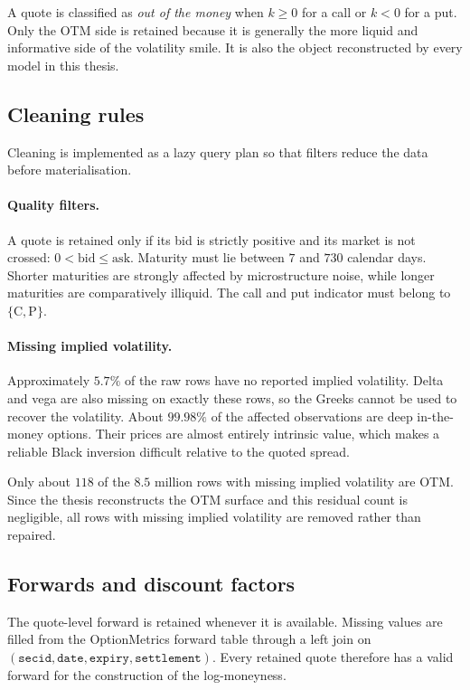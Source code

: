 A quote is classified as \emph{out of the money} when $k\ge0$ for a call or $k<0$ for a put.
Only the OTM side is retained because it is generally the more liquid and informative side of
the volatility smile. It is also the object reconstructed by every model in this thesis.

\subsection{Cleaning rules}\label{sec:cleaning}

Cleaning is implemented as a lazy query plan so that filters reduce the data before
materialisation.

\paragraph{Quality filters.}
A quote is retained only if its bid is strictly positive and its market is not crossed: $0<\mathrm{bid}\le\mathrm{ask}.$
Maturity must lie between $7$ and $730$ calendar days. Shorter maturities are strongly affected
by microstructure noise, while longer maturities are comparatively illiquid. The call and put
indicator must belong to $\{\mathrm{C},\mathrm{P}\}$.

\paragraph{Missing implied volatility.}
Approximately $5.7\%$ of the raw rows have no reported implied volatility. Delta and vega are
also missing on exactly these rows, so the Greeks cannot be used to recover the volatility.
About $99.98\%$ of the affected observations are deep in-the-money options. Their prices are
almost entirely intrinsic value, which makes a reliable Black inversion difficult relative to
the quoted spread.

Only about $118$ of the $8.5$ million rows with missing implied volatility are OTM. Since the
thesis reconstructs the OTM surface and this residual count is negligible, all rows with
missing implied volatility are removed rather than repaired.

\subsection{Forwards and discount factors}\label{sec:forwards}

The quote-level forward is retained whenever it is available. Missing values are filled from
the OptionMetrics forward table through a left join on $(\texttt{secid},\texttt{date},\texttt{expiry},\texttt{settlement}).$
Every retained quote therefore has a valid forward for the construction of the log-moneyness.

